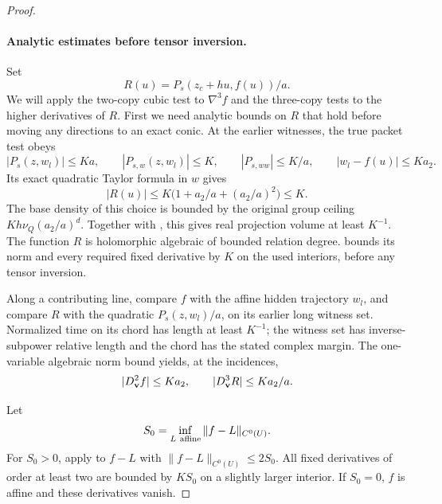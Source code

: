 \begin{proof}
\paragraph{Analytic estimates before tensor inversion.}
Set
\begin{equation}\label{a05:normalized-test}
 R(u)=P_s(z_c+hu,f(u))/a.
\end{equation}
We will apply the two-copy cubic test to \(\nabla^3f\) and the
three-copy tests to the higher derivatives of \(R\). First we
need analytic bounds on \(R\) that hold before moving any
directions to an exact conic.
At the earlier witnesses, the true packet test obeys
\[
 |P_s(z,w_l)|\leq Ka,\qquad
 |P_{s,w}(z,w_l)|\leq K,\qquad
 |P_{s,ww}|\leq K/a,
 \qquad |w_l-f(u)|\leq Ka_2.
\]
Its exact quadratic Taylor formula in \(w\) gives
\[
 |R(u)|\leq K\bigl(1+a_2/a+(a_2/a)^2\bigr)\leq K.
\]
The base density of this choice is bounded by the original
group ceiling \(Kh\nu_Q(a_2/a)^d\).
Together with , this gives real projection
volume at least \(K^{-1}\).
The function \(R\) is holomorphic algebraic of bounded relation
degree.  bounds its norm and every
required fixed derivative by \(K\) on the used interiors,
before any tensor inversion.

Along a contributing line, compare \(f\) with the affine hidden
trajectory \(w_l\), and compare \(R\) with the quadratic
\(P_s(z,w_l)/a\), on its earlier long witness set.
Normalized time on its chord has length at least \(K^{-1}\);
the witness set has inverse-subpower relative length and the
chord has the stated complex margin.
The one-variable algebraic norm bound yields, at the incidences,
\begin{equation}\label{a05:directional-branch}
 |D_{\bf v}^2f|\leq Ka_2,\qquad
 |D_{\bf v}^3R|\leq Ka_2/a.
\end{equation}

Let
\[
 S_0=\inf_{L\ {\rm affine}}\|f-L\|_{C^0(U)}.
\]
For \(S_0>0\), apply  to
\(f-L\) with \(\|f-L\|_{C^0(U)}\leq2S_0\).
All fixed derivatives of order at least two are bounded by
\(KS_0\) on a slightly larger interior. If \(S_0=0\), \(f\)
is affine and these derivatives vanish.


\end{proof}
